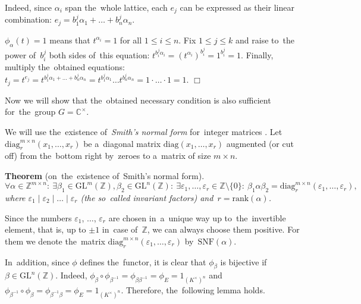 \documentclass[twoside]{article}
\begin{document}
    Indeed, since $\alpha_i$ span the~whole lattice, each $e_j$ can be expressed as their linear combination:
    $
        e_j = b^j_1 \alpha_1 + \ldots + b^j_n \alpha_n.
    $

    $\phi_\alpha(t) = 1$ means that $t^{\alpha_i} = 1$ for all $1 \leq i \leq n$.
    Fix $1 \leq j \leq k$ and raise to~the power of~$b^j_i$ both sides of~this equation:
    $t^{b^j_i \alpha_i} = (t^{\alpha_i})^{b^j_i} = 1^{b^j_i} = 1$.
    Finally, multiply the~obtained equations:
    $
        t_j = t^{e_j} = t^{b^j_1 \alpha_1 + \ldots + b^j_n \alpha_n} = t^{b^j_1 \alpha_1} \ldots t^{b^j_n \alpha_n} = 1 \cdot \ldots \cdot 1 = 1.
    $
\hfill$\Box$\medskip

Now we will show that the~obtained necessary condition is also sufficient for~the~group $G = {\mathbb{C}^\times}$.

We will use the~existence of~\textit{Smith's normal form} for~integer matrices \cite{Smth60}.
Let $\mathrm{diag}^{m \times n}_r(x_1,\allowbreak \ldots,\allowbreak x_r)$ be a~diagonal matrix $\mathrm{diag}(x_1,\allowbreak \ldots,\allowbreak x_r)$
augmented (or cut off) from the~bottom right by~zeroes to a~matrix of size $m \times n$.

\medskip\noindent\textbf{Theorem} (on~the~existence of~Smith's normal form).\emph{
    $$
        \forall \alpha \in \mathbb{Z}^{m \times n}{:}\
        \exists \beta_1 \in \mathrm{GL}^m(\mathbb{Z}), \beta_2 \in \mathrm{GL}^n(\mathbb{Z}){:} \
        \exists \varepsilon_1, \ldots, \varepsilon_r \in \mathbb{Z} \setminus \{0\}{:} \
        \beta_1 \alpha \beta_2 = \mathrm{diag}^{m \times n}_r(\varepsilon_1, \ldots, \varepsilon_r),
    $$
    where $\varepsilon_1 \mid \varepsilon_2 \mid \ldots \mid \varepsilon_r$ (the so~called invariant factors) and~$r = \mathrm{rank}(\alpha)$.
}\medskip

Since the numbers $\varepsilon_1$, $\ldots$, $\varepsilon_r$ are chosen in~a~unique way up to~the~invertible element,
that is, up to $\pm 1$ in~case of~$\mathbb{Z}$, we can always choose them positive. For them we denote
the~matrix $\mathrm{diag}^{m \times n}_r(\varepsilon_1, \ldots, \varepsilon_r)$ by~$\mathrm{SNF}(\alpha)$.

In~addition, since $\phi$ defines the~functor, it is clear that $\phi_\beta$ is bijective if $\beta \in \mathrm{GL}^n(\mathbb{Z})$.
Indeed, $\phi_\beta \circ \phi_{\beta^{-1}} = \phi_{\beta \beta^{-1}} = \phi_E = 1_{(K^\times)^n}$
and~$\phi_{\beta^{-1}} \circ \phi_\beta = \phi_{\beta^{-1} \beta} = \phi_E = 1_{(K^\times)^n}$. Therefore,
the~following lemma holds.
\end{document}
